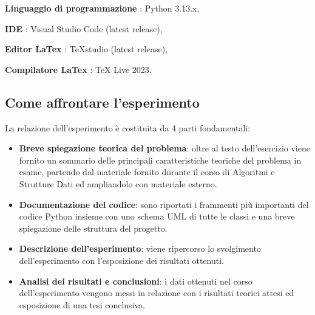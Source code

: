 		\begin{DESC}{1}
			\item [\textbf{Linguaggio di programmazione}]: Python 3.13.x,
			\item[\textbf{IDE}]: Visual Studio Code (latest release),
			\item[\textbf{Editor LaTex}]: TeXstudio (latest release),
			\item[\textbf{Compilatore LaTex}]: TeX Live 2023. 
		\end{DESC}
			
	\subsection{Come affrontare l'esperimento}
La relazione dell'esperimento è costituita da 4 parti fondamentali:
		
		\begin{itemize}
			\item \textbf{Breve spiegazione teorica del problema}: oltre al testo dell'esercizio viene fornito un sommario delle principali caratteristiche teoriche del problema in esame, partendo dal materiale fornito durante il corso di Algoritmi e Strutture Dati ed ampliandolo con materiale esterno.
			\item \textbf{Documentazione del codice}: sono riportati i frammenti più importanti del codice Python insieme con uno schema UML di tutte le classi e una breve spiegazione delle struttura del progetto.
			\item \textbf{Descrizione dell'esperimento}: viene ripercorso lo svolgimento dell'esperimento con l'esposizione dei risultati ottenuti.
			\item \textbf{Analisi dei risultati e conclusioni}: i dati ottenuti nel corso dell'esperimento vengono messi in relazione con i risultati teorici attesi ed esposizione di una tesi conclusiva.
		\end{itemize}
		